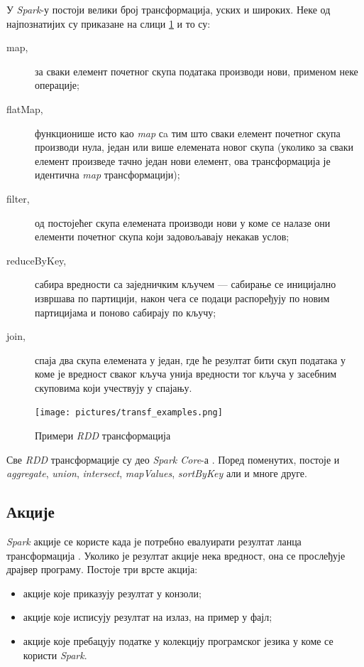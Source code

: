 \documentclass[12pt,oneside]{memoir}
\begin{document}
У \textit{Spark}-у постоји велики број трансформација, уских и широких. Неке од најпознатијих су приказане на слици \ref{fig:sprk_trnsf_examples} и то су:

\begin{description}
	\item[map,] за сваки елемент почетног скупа података производи нови, применом неке операције;
	\item[flatMap,] функционише исто као \textit{map} сa тим што сваки елемент почетног скупа производи нула, један или више елемената новог скупа (уколико за сваки елемент произведе тачно један нови елемент, ова трансформација је идентична \textit{map} трансформацији);
	\item[filter,] од постојећег скупа елемената производи нови у коме се налазе они елементи почетног скупа који задовољавају некакав услов;
	\item[reduceByKey,] сабира вредности са заједничким кључем --- сабирање се иницијално извршава по партицији, након чега се подаци распоређују по новим партицијама и поново сабирају по кључу;
	\item[join,] спаја два скупа елемената у један, где ће резултат бити скуп података у коме је вредност сваког кључа унија вредности тог кључа у засебним скуповима који учествују у спајању.
\end{description}

\begin{figure}[!ht]
  \centering
  \texttt{[image: pictures/transf\_examples.png]}
  \caption{Примери \textit{RDD} трансформација}
  \label{fig:sprk_trnsf_examples}
\end{figure}

Све \textit{RDD} трансформације су део \textit{Spark Core}-а \cite{spark_rdd_transf}. Поред поменутих, постоје и \textit{aggregate}, \textit{union}, \textit{intersect}, \textit{mapValues}, \textit{sortByKey} али и многе друге.

\subsection{Акције}
\label{subsec:spark_akc}

\textit{Spark} акције се користе када је потребно евалуирати резултат ланца трансформација \cite{spark_guide}. Уколико је резултат акције нека вредност, она се прослеђује драјвер програму. Постоје три врсте акција:

\begin{itemize}
\item акције које приказују резултат у конзоли;
\item акције које исписују резултат на излаз, на пример у фајл;
\item акције које пребацују податке у колекцију програмског језика у коме се користи \textit{Spark}.
\end{itemize}
\end{document}
